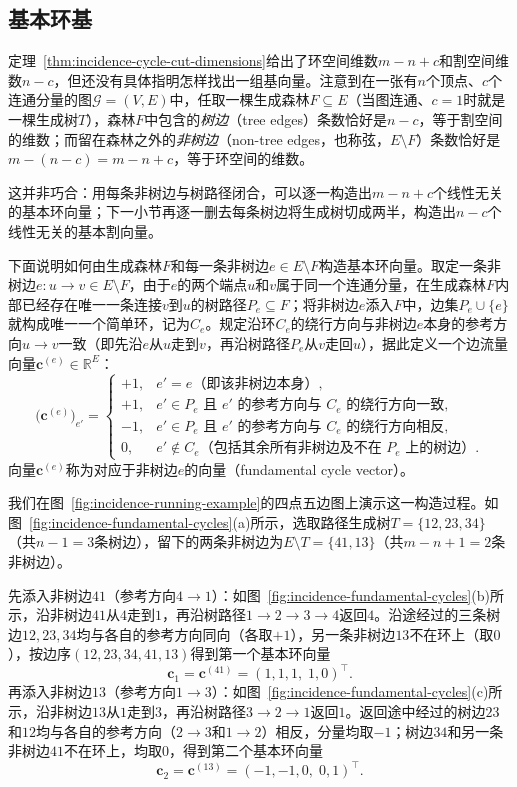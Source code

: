 \subsection{基本环基}
\label{sec:incidence-fundamental-bases}

定理~\ref{thm:incidence-cycle-cut-dimensions}给出了环空间维数$m-n+c$和割空间维数$n-c$，但还没有具体指明怎样找出一组基向量。注意到在一张有$n$个顶点、$c$个连通分量的图$\mathcal{G}=(V,E)$中，任取一棵生成森林$F\subseteq E$（当图连通、$c=1$时就是一棵生成树$T$），森林$F$中包含的\emph{树边}（tree edges）条数恰好是$n-c$，等于割空间的维数；而留在森林之外的\emph{非树边}（non-tree edges，也称弦，$E\setminus F$）条数恰好是$m-(n-c)=m-n+c$，等于环空间的维数。

这并非巧合：用每条非树边与树路径闭合，可以逐一构造出$m-n+c$个线性无关的基本环向量；下一小节再逐一删去每条树边将生成树切成两半，构造出$n-c$个线性无关的基本割向量。

下面说明如何由生成森林$F$和每一条非树边$e\in E\setminus F$构造基本环向量。取定一条非树边$e\colon u\to v\in E\setminus F$，由于$e$的两个端点$u$和$v$属于同一个连通分量，在生成森林$F$内部已经存在唯一一条连接$v$到$u$的树路径$P_e\subseteq F$；将非树边$e$添入$F$中，边集$P_e\cup\{e\}$就构成唯一一个简单环，记为$C_e$。规定沿环$C_e$的绕行方向与非树边$e$本身的参考方向$u\to v$一致（即先沿$e$从$u$走到$v$，再沿树路径$P_e$从$v$走回$u$），据此定义一个边流量向量$\bm{c}^{(e)}\in\mathbb{R}^E$：
\[
\bigl(\bm{c}^{(e)}\bigr)_{e'}=
\begin{cases}
+1,& e'=e\text{（即该非树边本身）},\\[2pt]
+1,& e'\in P_e\text{ 且 }e'\text{ 的参考方向与 }C_e\text{ 的绕行方向一致},\\[2pt]
-1,& e'\in P_e\text{ 且 }e'\text{ 的参考方向与 }C_e\text{ 的绕行方向相反},\\[2pt]
0,& e'\notin C_e\text{（包括其余所有非树边及不在 }P_e\text{ 上的树边）}.
\end{cases}
\]
向量$\bm{c}^{(e)}$称为对应于非树边$e$的向量（fundamental cycle vector）。

我们在图~\ref{fig:incidence-running-example}的四点五边图上演示这一构造过程。如图~\ref{fig:incidence-fundamental-cycles}(a)所示，选取路径生成树$T=\{12,23,34\}$（共$n-1=3$条树边），留下的两条非树边为$E\setminus T=\{41,13\}$（共$m-n+1=2$条非树边）。

先添入非树边$41$（参考方向$4\to1$）：如图~\ref{fig:incidence-fundamental-cycles}(b)所示，沿非树边$41$从$4$走到$1$，再沿树路径$1\to2\to3\to4$返回$4$。沿途经过的三条树边$12,23,34$均与各自的参考方向同向（各取$+1$），另一条非树边$13$不在环上（取$0$），按边序$(12,23,34,41,13)$得到第一个基本环向量
\[
\bm{c}_1=\bm{c}^{(41)}=(1,1,1,\;1,0)^\top.
\]
再添入非树边$13$（参考方向$1\to3$）：如图~\ref{fig:incidence-fundamental-cycles}(c)所示，沿非树边$13$从$1$走到$3$，再沿树路径$3\to2\to1$返回$1$。返回途中经过的树边$23$和$12$均与各自的参考方向（$2\to3$和$1\to2$）相反，分量均取$-1$；树边$34$和另一条非树边$41$不在环上，均取$0$，得到第二个基本环向量
\[
\bm{c}_2=\bm{c}^{(13)}=(-1,-1,0,\;0,1)^\top.
\]

